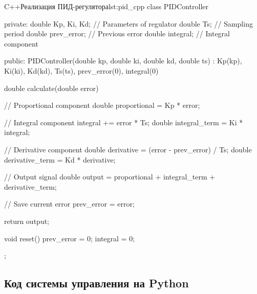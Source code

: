 \begin{CodeBlock}{C++}{Реализация ПИД-регулятора}{lst:pid_cpp}
class PIDController {
private:
    double Kp, Ki, Kd;           // Parameters of regulator
    double Ts;                   // Sampling period
    double prev_error;           // Previous error
    double integral;             // Integral component
    
public:
    PIDController(double kp, double ki, double kd, double ts) 
        : Kp(kp), Ki(ki), Kd(kd), Ts(ts), prev_error(0), integral(0) {}
    
    double calculate(double error) {
        // Proportional component
        double proportional = Kp * error;
        
        // Integral component
        integral += error * Ts;
        double integral_term = Ki * integral;
        
        // Derivative component
        double derivative = (error - prev_error) / Ts;
        double derivative_term = Kd * derivative;
        
        // Output signal
        double output = proportional + integral_term + derivative_term;
        
        // Save current error
        prev_error = error;
        
        return output;
    }
    
    void reset() {
        prev_error = 0;
        integral = 0;
    }
};
\end{CodeBlock}

\subsection{Код системы управления на Python}

